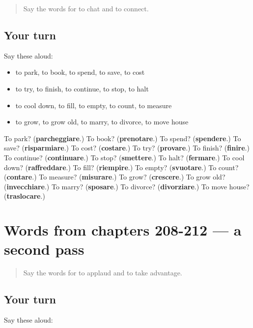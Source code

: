 \label{lesson:IT-R212-first-pass-words-from-chapters-204-207}



\begin{quote}
Say the words for to chat and to connect.
\end{quote}

\subsection*{Your turn}
Say these aloud:

\begin{itemize}
\raggedright
  \item to park, to book, to spend, to save, to cost
  \item to try, to finish, to continue, to stop, to halt
  \item to cool down, to fill, to empty, to count, to measure
  \item to grow, to grow old, to marry, to divorce, to move house
\end{itemize}

\begin{tcolorbox}[breakable,colback=teal!4,colframe=teal!35!black,title={Before you move on}]
To park? (\textbf{parcheggiare}.) To book? (\textbf{prenotare}.) To spend? (\textbf{spendere}.) To save? (\textbf{risparmiare}.) To cost? (\textbf{costare}.) To try? (\textbf{provare}.) To finish? (\textbf{finire}.) To continue? (\textbf{continuare}.) To stop? (\textbf{smettere}.) To halt? (\textbf{fermare}.) To cool down? (\textbf{raffreddare}.) To fill? (\textbf{riempire}.) To empty? (\textbf{svuotare}.) To count? (\textbf{contare}.) To measure? (\textbf{misurare}.) To grow? (\textbf{crescere}.) To grow old? (\textbf{invecchiare}.) To marry? (\textbf{sposare}.) To divorce? (\textbf{divorziare}.) To move house? (\textbf{traslocare}.)
\end{tcolorbox}
\section[(dialogue)]{Words from chapters 208-212 — a second pass}

\label{lesson:IT-R212-second-pass-words-from-chapters-208-212}



\begin{quote}
Say the words for to applaud and to take advantage.
\end{quote}

\subsection*{Your turn}
Say these aloud:

